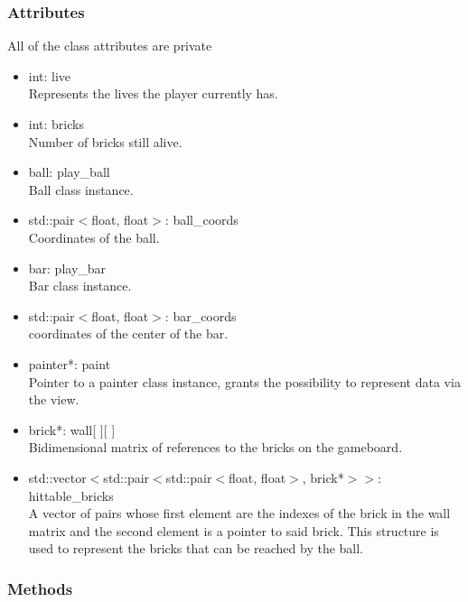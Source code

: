 \documentclass[]{article}
\begin{document}
\subsubsection{Attributes}
All of the class attributes are private
	\begin{itemize}
		\item int: live \\Represents the lives the player currently has.
		\item int: bricks \\Number of bricks still alive.
		\item ball: play\_ball \\Ball class instance.
		\item std::pair$<$float, float$>$: ball\_coords\\Coordinates of the ball.
		\item bar: play\_bar\\Bar class instance.
		\item std::pair$<$float, float$>$: bar\_coords\\coordinates of the center of the bar.
		\item painter*: paint \\ Pointer to a painter class instance, grants the possibility to represent data via the view.
		\item brick*: wall[ ][ ] \\Bidimensional matrix of references to the bricks on the gameboard.
		\item std::vector$<$std::pair$<$std::pair$<$float, float$>$, brick*$>$$>$: hittable\_bricks \\ A vector of pairs whose first element are the indexes of the brick in the wall matrix and the second element is a pointer to said brick. This structure is used to represent the bricks that can be reached by the ball.
	\end{itemize}

\subsubsection{Methods}
\end{document}
